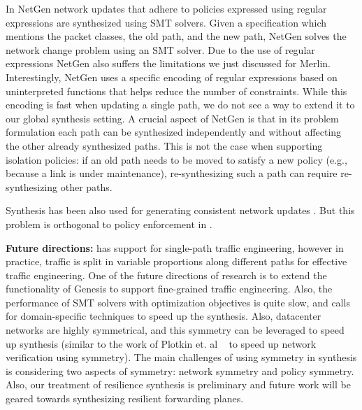 In NetGen network updates that adhere to policies expressed using
regular expressions are synthesized using SMT solvers.  Given a
specification which mentions the packet classes, the old path, and the
new path, NetGen solves the network change problem using an SMT solver.
Due to the use of regular expressions NetGen also suffers the
limitations we just discussed for Merlin.  Interestingly, NetGen uses
a specific encoding of regular expressions based on uninterpreted
functions that helps reduce the number of constraints. While this
encoding is fast when updating a single path, we do not see a way to
extend it to our global synthesis setting.  A crucial aspect of NetGen
is that in its problem formulation each path can be synthesized
independently and without affecting the other already synthesized
paths.  This is not the case when supporting isolation policies: if an
old path needs to be moved to satisfy a new policy (e.g., because a
link is under maintenance), re-synthesizing such a path can require
re-synthesizing other paths. 

Synthesis has been also used for generating consistent network
updates \cite{updates, customconsistency}. But this problem is orthogonal to 
policy enforcement in \Name.


\noindent
{\bf Future directions:}
\Name has support for single-path traffic engineering, however in
practice, traffic is split in variable proportions along different 
paths for effective traffic engineering. One of the future 
directions of research is to extend the functionality of Genesis
to support fine-grained traffic engineering. Also, the performance
of SMT solvers with optimization objectives is quite slow, and calls for 
domain-specific techniques to speed up the synthesis. Also, datacenter
networks are highly symmetrical, and this symmetry can be leveraged
to speed up synthesis (similar to the work of Plotkin et. al ~\cite{symmetry} to
speed up network verification using symmetry). The main challenges of
using symmetry in synthesis is considering two aspects of symmetry: network
symmetry and policy symmetry. Also, our treatment of resilience synthesis
is preliminary and future work will be geared towards synthesizing resilient
forwarding planes. 
 
